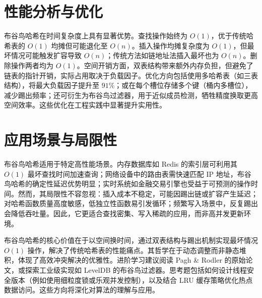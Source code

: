 \chapter{性能分析与优化}
布谷鸟哈希在时间复杂度上具有显著优势。查找操作始终为 $O(1)$，优于传统哈希表的 $O(1)$ 均摊但可能退化至 $O(n)$。插入操作均摊复杂度为 $O(1)$，但最坏情况可能触发扩容导致 $O(n)$；传统方法如链地址法插入最坏也为 $O(n)$。删除操作两者均为 $O(1)$。空间开销方面，双表结构带来额外内存负担，但避免了链表的指针开销，实际占用取决于负载因子。优化方向包括使用多哈希表（如三表结构），将最大负载因子提升至 $91\%$；或在每个槽位存储多个键（桶内多槽位），减少踢出频率；还可衍生为布谷鸟过滤器，用于近似成员检测，牺牲精度换取更高空间效率。这些优化在工程实践中显著提升实用性。\par
\chapter{应用场景与局限性}
布谷鸟哈希适用于特定高性能场景。内存数据库如 Redis 的索引层可利用其 $O(1)$ 最坏查找时间加速查询；网络设备中的路由表需快速匹配 IP 地址，布谷鸟哈希的确定性延迟优势明显；实时系统如金融交易引擎也受益于可预测的操作时间。然而，其局限性不容忽视：插入成本不稳定，可能因踢出链或扩容产生延迟；对哈希函数质量高度敏感，低独立性函数易引发循环；频繁写入场景中，反复踢出会降低吞吐量。因此，它更适合查找密集、写入稀疏的应用，而非高并发更新环境。\par
布谷鸟哈希的核心价值在于以空间换时间，通过双表结构与踢出机制实现最坏情况 $O(1)$ 操作，解决了传统哈希表的性能痛点。其哲学在于动态调整而非静态堆积，体现了高效冲突解决的优雅性。进阶学习建议阅读 Pagh \&{} Rodler 的原始论文，或探索工业级实现如 LevelDB 的布谷鸟过滤器。思考题包括如何设计线程安全版本（例如使用细粒度锁或乐观并发控制），以及结合 LRU 缓存策略优化热点数据访问。这些方向将深化对算法的理解与应用。\par
